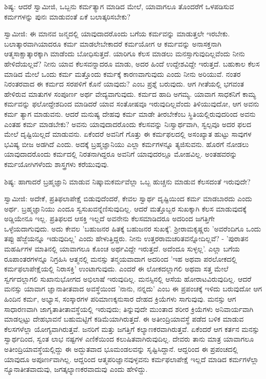 ಶಿಷ್ಯ: ಆದರೆ ಸ್ವಾಮೀಜಿ, ಒಬ್ಬನು ಕರ್ಮತ್ಯಾಗ ಮಾಡಿದ ಮೇಲೆ, ಯಾವಾಗಲೂ ತೊಂದರೆಗೆ ಒಳಪಡಿಸುವ ಕರ್ಮಗಳನ್ನು ಪುನಃ ಮಾಡುವಂತೆ ಏಕೆ ಬಲಾತ್ಕರಿಸಬೇಕು?

ಸ್ವಾಮೀಜಿ: ಈ ಮಾನವ ಜನ್ಮದಲ್ಲಿ ಯಾವುದಾದರೊಂದು ಬಗೆಯ ಕರ್ಮವನ್ನು ಮಾಡುತ್ತಲೇ ಇರಬೇಕು. ಬಲಾತ್ಕಾರವಾಗಿಯಾದರೂ ಕರ್ಮ ಮಾಡಲೇಬೇಕಾದರೆ ಕರ್ಮಯೋಗ ಆ ಕರ್ಮವನ್ನು ಅನಾಸಕ್ತನಾಗಿ ಆತ್ಮಸಾಕ್ಷಾತ್ಕಾರಕ್ಕಾಗಿ ಮಾಡೆಂದು ಬೋಧಿಸುತ್ತದೆ. ಯಾರಿಗೂ ಕೆಲಸ ಮಾಡಲು ಮನಸ್ಸಾಗುವುದಿಲ್ಲವೆಂದು ನೀನು ಹೇಳಿದೆಯಲ್ಲವೆ? ನೀನು ಯಾವ ಕೆಲಸವನ್ನಾದರೂ ಮಾಡು, ಅದರ ಹಿಂದೆ ಉದ್ದೇಶವಿದ್ದೇ ಇರುತ್ತದೆ. ಬಹುಕಾಲ ಕೆಲಸ ಮಾಡಿದ ಮೇಲೆ ಒಂದು ಕರ್ಮ ಮತ್ತೊಂದು ಕರ್ಮಕ್ಕೆ ಕಾರಣವಾಗುವುದು ಎಂದು ನೀನು ಅರಿಯುವೆ. ನಂತರ ನಿರಂತರವಾದ ಈ ಕರ್ಮದ ಸರಪಳಿಗೆ ಕೊನೆ ಯಾವುದು? ಎಂಬ ಪ್ರಶ್ನೆ ಬರುವುದು. ಆಗ ಗೀತೆಯಲ್ಲಿ ಭಗವಂತ ಹೇಳಿರುವ ಮಾತುಗಳ ಸಂಪೂರ್ಣ ಅರ್ಥ ವೇದ್ಯವಾಗುವುದು. ಕರ್ಮದ ಹಾದಿ ಅಗಮ್ಯ. ಯಾವಾಗ ಸಾಧಕನಿಗೆ ಕಾಮ್ಯ ಕರ್ಮವನ್ನು ಫಲೋದ್ದೇಶದಿಂದ ಮಾಡಿದರೆ ಯಾವ ಸಂತೋಷವೂ ಇರುವುದಿಲ್ಲವೆಂದು ತಿಳಿಯುವುದೋ, ಆಗ ಅವನು ಕರ್ಮ ತ್ಯಾಗ ಮಾಡುವನು. ಆದರೆ ಮನುಷ್ಯ ದೇಹವು ಕರ್ಮ ಮಾಡೇ ತೀರಬೇಕೆಂಬ ಸ್ಥಿತಿಯಲ್ಲಿರುವುದರಿಂದ ಅವನು ಎಂತಹ ಕರ್ಮ ಮಾಡಬೇಕು? ಅವನು ಯಾವುದಾದರೊಂದು ಕೆಲಸವನ್ನು ನಿಃಸ್ವಾರ್ಥವಾಗಿ, ಸ್ವಲ್ಪವೂ ಅದರ ಫಲದ ಮೇಲೆ ದೃಷ್ಟಿಯಿಲ್ಲದೆ ಮಾಡುವನು. ಏಕೆಂದರೆ ಅವನಿಗೆ ಗೊತ್ತು ಈ ಕರ್ಮಫಲದಲ್ಲಿ ಅಸಂಖ್ಯಾತ ಹುಟ್ಟು ಸಾವುಗಳ ಭವಿಷ್ಯ ಬೀಜ ಅಡಗಿದೆ ಎಂದು. ಅದಕ್ಕೆ ಬ್ರಹ್ಮಜ್ಞಾನಿಯು ಎಲ್ಲಾ ಕರ್ಮಗಳನ್ನೂ ತ್ಯಜಿಸುವನು. ಹೊರಗೆ ನೋಡಲು ಯಾವುದಾದರೊಂದು ಕರ್ಮದಲ್ಲಿ ನಿರತನಾಗಿದ್ದರೂ ಅವನಿಗೆ ಯಾವುದರಲ್ಲೂ ಮೋಹವಿಲ್ಲ. ಅಂತಹವರನ್ನು ಕರ್ಮಯೋಗಿಗಳೆಂದು ಶಾಸ್ತ್ರಗಳು ಕರೆಯುವುವು.

ಶಿಷ್ಯ: ಹಾಗಾದರೆ ಬ್ರಹ್ಮಜ್ಞಾನಿ ಮಾಡುವ ನಿಷ್ಕಾಮಕರ್ಮವೆಲ್ಲಾ ಒಬ್ಬ ಹುಚ್ಚನು ಮಾಡುವ ಕೆಲಸದಂತೆ ಇರುವುದೇ?

ಸ್ವಾಮೀಜಿ: ಅದೇಕೆ, ಪ್ರತಿಫಲಾಪೇಕ್ಷೆ ಬಿಡುವುದೆಂದರೆ, ಕೇವಲ ಸ್ವಾರ್ಥ ದೃಷ್ಟಿಯಿಂದ ಕರ್ಮ ಮಾಡಬಾರದು ಎಂದು ಅರ್ಥ. ಬ್ರಹ್ಮಜ್ಞಾನಿಯು ಎಂದೂ ಸ್ವಸುಖವನ್ನೆಣಿಸುವುದಿಲ್ಲ. ಆದರೆ ಮತ್ತೊಬ್ಬರ ಸುಖಕ್ಕಾಗಿ ಕೆಲಸ ಮಾಡುವುದಕ್ಕೆ ಅಡ್ಡಿಯೇನೂ ಇಲ್ಲ. ಪ್ರತಿಫಲದ ಆಸಕ್ತಿ ಇಲ್ಲದೆ ಅವನೇನು ಕೆಲಸಮಾಡಿದರೂ ಅದರಿಂದ ಜಗತ್ತಿಗೇ ಒಳ್ಳೆಯದಾಗುವುದು. ಅದು ಕೇವಲ 'ಬಹುಜನರ ಹಿತಕ್ಕೆ ಬಹುಜನರ ಸುಖಕ್ಕೆ'. ಶ‍್ರೀರಾಮಕೃಷ್ಣರು 'ಅವರೆಂದಿಗೂ ಒಂದು ತಪ್ಪು ಹೆಜ್ಜೆಯನ್ನೂ ಇಡುವುದಿಲ್ಲ' ಎಂದು ಹೇಳುತ್ತಿದ್ದರು. ನೀನು ಉತ್ತರರಾಮಚರಿತವನ್ನೋದಿಲ್ಲವೆ? - 'ಪುರಾತನ ಮಹರ್ಷಿಗಳ ಮಾತಿನಲ್ಲಿ ಯಾವಾಗಲೂ ಕೊಂಚ ಅರ್ಥವಿದ್ದೇ ಇರುತ್ತದೆ. ಅದೆಂದೂ ಸುಳ್ಳಲ್ಲ'. ಎಲ್ಲಾ ಬಗೆಯ ರೂಪಾಂತರಗಳನ್ನೂ ನಿಗ್ರಹಿಸಿ ಆತ್ಮನಲ್ಲಿ ಮನಸ್ಸು ತನ್ಮಯವಾದಾಗ ಅದರಿಂದ 'ಇಹ ಅಥವಾ ಪರಲೋಕದಲ್ಲಿ ಕರ್ಮಫಲಾಪೇಕ್ಷೆಯಲ್ಲಿ ನಿರಾಸಕ್ತಿ' ಉಂಟಾಗುವುದು. ಎಂದರೆ ಈ ಲೋಕದಲ್ಲಾಗಲಿ ಅಥವಾ ಸತ್ತ ಮೇಲೆ ಸ್ವರ್ಗದಲ್ಲಾಗಲಿ ಸುಖಾನುಭೋಗದ ಅಭಿಲಾಷೆ ಇರುವುದಿಲ್ಲ. ಮನಸ್ಸಿನಲ್ಲಿ ಆಸೆಯ ಹೋರಾಟವಿರುವುದಿಲ್ಲ. ಆದರೆ ಮನಸ್ಸು ಯಾವಾಗ ಜ್ಞಾನಾತೀತವಾದ ಅವಸ್ಥೆಯಿಂದ 'ನಾನು, ನನ್ನದು' ಎಂಬ ಈ ಪ್ರಪಂಚಕ್ಕೆ ಇಳಿದು ಬರುವುದೋ ಆಗ ಹಿಂದಿನ ಕರ್ಮ, ಅಭ್ಯಾಸ, ಸಂಸ್ಕಾರಗಳ ಪರಿಮಾಣಕ್ಕನುಸಾರ ದೇಹದ ಕ್ರಿಯೆಗಳು ಸಾಗುವುವು. ಮನಸ್ಸು ಆಗ ಸಾಧಾರಣವಾಗಿ ಜಾಗೃತಾತೀತಾವಸ್ಥೆಯಲ್ಲಿ ಇರುವುದು; ತಿನ್ನುವುದೇ ಮುಂತಾದ ಶರೀರ ಕ್ರಿಯೆಗಳು ಅನಿವಾರ್ಯವಾಗಿ ಮಾಡಲ್ಪಟ್ಟು ದೇಹಭಾವನೆ ಬಹುಮಟ್ಟಿಗೆ ಕಡಿಮೆಯಾಗಿರುತ್ತದೆ. ಈ ಅತೀಂದ್ರಿಯಾವಸ್ಥೆ ಪಡೆದ ಬಳಿಕ ಮಾಡುವ ಕೆಲಸಗಳೆಲ್ಲಾ ಯೋಗ್ಯವಾಗಿರುತ್ತವೆ. ಜನರಿಗೆ ಮತ್ತು ಜಗತ್ತಿಗೆ ಕಲ್ಯಾಣಕರವಾಗಿರುತ್ತವೆ. ಏಕೆಂದರೆ ಆಗ ಕರ್ತನ ಮನಸ್ಸು ಸ್ವಾರ್ಥದಿಂದ, ಸ್ವಂತ ಲಾಭ ನಷ್ಟಗಳ ಎಣಿಕೆಯಿಂದ ಕಲುಷಿತವಾಗಿರುವುದಿಲ್ಲ. ದೇವರು ತಾನು ಮಾತ್ರ ಯಾವಾಗಲೂ ಅತೀಂದ್ರಿಯಾವಸ್ಥೆಯಲ್ಲಿದ್ದು ಈ ಅದ್ಭುತವಾದ ಭೂಮಂಡಲವನ್ನು ಸೃಷ್ಟಿಸಿದ್ದಾನೆ. ಆದ್ದರಿಂದ ಈ ಪ್ರಪಂಚದಲ್ಲಿ ಯಾವುದೂ ಅಪೂರ್ಣವಾಗಿಲ್ಲ. ಆದ್ದರಿಂದ ಆತ್ಮಪರಿಜ್ಞಾನವುಳ್ಳವನು ಕರ್ಮಫಲಾಪೇಕ್ಷೆ ಇಲ್ಲದೆ ಮಾಡಿದ ಕರ್ಮಗಳೆಲ್ಲಾ ನ್ಯೂನಾತೀತವಾದುವು, ಜಗತ್ಕಲ್ಯಾಣಕರವಾದುವು ಎಂದು ಹೇಳಿದ್ದು.

